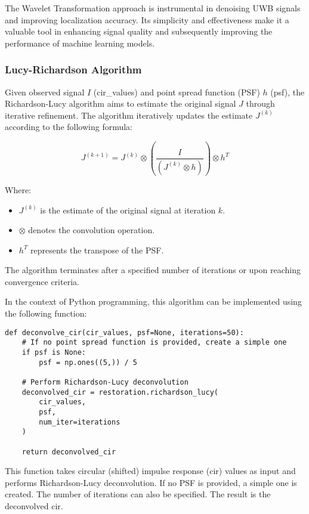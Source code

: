 The Wavelet Transformation approach is instrumental in denoising UWB signals and improving localization accuracy. Its simplicity and effectiveness make it a valuable tool in enhancing signal quality and subsequently improving the performance of machine learning models.

\subsubsection{Lucy-Richardson Algorithm}

Given observed signal $I$ (cir\_values) and point spread function (PSF) $h$ (psf), the Richardson-Lucy algorithm aims to estimate the original signal $J$ through iterative refinement. The algorithm iteratively updates the estimate $J^{(k)}$ according to the following formula:

\begin{equation}
J^{(k+1)} = J^{(k)} \otimes \left( \frac{I}{(J^{(k)} \otimes h)} \right) \otimes h^T
\end{equation}

Where:
\begin{itemize}
    \item $J^{(k)}$ is the estimate of the original signal at iteration $k$.
    \item $\otimes$ denotes the convolution operation.
    \item $h^T$ represents the transpose of the PSF. 
\end{itemize}


The algorithm terminates after a specified number of iterations or upon reaching convergence criteria.

In the context of Python programming, this algorithm can be implemented using the following function:

\begin{verbatim}
def deconvolve_cir(cir_values, psf=None, iterations=50):
    # If no point spread function is provided, create a simple one
    if psf is None:
        psf = np.ones((5,)) / 5

    # Perform Richardson-Lucy deconvolution
    deconvolved_cir = restoration.richardson_lucy(
        cir_values, 
        psf, 
        num_iter=iterations
    )

    return deconvolved_cir
\end{verbatim}

This function takes circular (shifted) impulse response (\acrshort{cir}) values as input and performs Richardson-Lucy deconvolution. If no PSF is provided, a simple one is created. The number of iterations can also be specified. The result is the deconvolved \acrshort{cir}.

